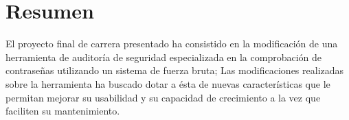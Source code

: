 \section*{Resumen}

El proyecto final de carrera presentado ha consistido en la modificación de una herramienta de auditoría de seguridad especializada en la comprobación de contraseñas utilizando un sistema de fuerza bruta; Las modificaciones realizadas sobre la herramienta ha buscado dotar a ésta de nuevas características que le permitan mejorar su usabilidad y su capacidad de crecimiento a la vez que faciliten su mantenimiento.
